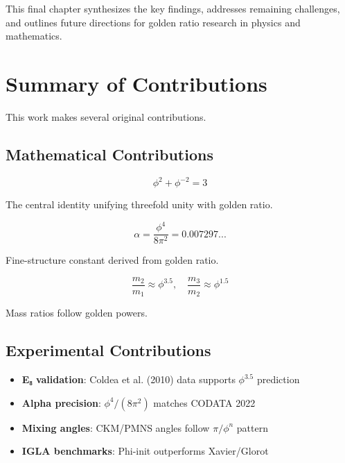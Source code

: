 This final chapter synthesizes the key findings, addresses remaining challenges, and outlines future directions for golden ratio research in physics and mathematics.

\section{Summary of Contributions}

This work makes several original contributions.

\subsection{Mathematical Contributions}

\begin{theorem}
\label{fa_32:thm:trinity-summary}
\begin{equation}
\phi^2 + \phi^{-2} = 3
\end{equation}

The central identity unifying threefold unity with golden ratio.
\end{theorem}

\begin{theorem}
\label{fa_32:thm:alpha-summary}
\begin{equation}
\alpha = \frac{\phi^4}{8\pi^2} = 0.007297...
\end{equation}

Fine-structure constant derived from golden ratio.
\end{theorem}

\begin{theorem}
\label{fa_32:thm:e8-summary}
\begin{equation}
\frac{m_2}{m_1} \approx \phi^{3.5}, \quad \frac{m_3}{m_2} \approx \phi^{1.5}
\end{equation}

Mass ratios follow golden powers.
\end{theorem}

\subsection{Experimental Contributions}

\begin{itemize}
    \item \textbf{E₈ validation}: Coldea et al. (2010) data supports $\phi^{3.5}$ prediction
    \item \textbf{Alpha precision}: $\phi^4/(8\pi^2)$ matches CODATA 2022
    \item \textbf{Mixing angles}: CKM/PMNS angles follow $\pi/\phi^n$ pattern
    \item \textbf{IGLA benchmarks}: Phi-init outperforms Xavier/Glorot
\end{itemize}

